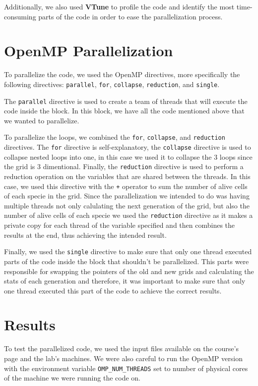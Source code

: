 \documentclass{article}
\begin{document}
Additionally, we also used \textbf{VTune} to profile the code and 
identify the most time-consuming parts of the code in order to ease 
the parallelization process.

\section{OpenMP Parallelization}
To parallelize the code, we used the OpenMP directives, more specifically  
the following directives: \texttt{parallel}, \texttt{for}, \texttt{collapse}, 
\texttt{reduction}, and \texttt{single}.

The \texttt{parallel} directive is used to create a team of threads 
that will execute the code inside the block. In this block, we have 
all the code mentioned above that we wanted to parallelize. 

To parallelize the loops, we combined the \texttt{for}, \texttt{collapse}, 
and \texttt{reduction} directives. The \texttt{for} directive is self-explanatory, 
the \texttt{collapse} directive is used to collapse nested loops into one, in 
this case we used it to collapse the 3 loops since the grid is 3 dimentional.
Finally, the \texttt{reduction} directive is used to perform a reduction 
operation on the variables that are shared between the threads. In this case, we 
used this directive with the \texttt{+} operator to sum the number of alive cells 
of each specie in the grid. Since the parallelization we intended to do was having 
multiple threads not only calulating the next generation of the grid, but also the 
number of alive cells of each specie we used the \texttt{reduction} directive as it 
makes a private copy for each thread of the variable specified and then combines 
the results at the end, thus achieving the intended result. 

Finally, we used the \texttt{single} directive to make sure that only one thread 
executed parts of the code inside the block that shouldn't be parallelized. This 
parts were responsible for swapping the pointers of the old and new grids and calculating the 
stats of each generation and therefore, it was important to make sure that only 
one thread executed this part of the code to achieve the correct results.

\section{Results}

To test the parallelized code, we used the input files available on the course's page 
and the lab's machines. We were also careful to run the OpenMP version with the 
environment variable \texttt{OMP\_NUM\_THREADS} set to number of physical cores 
of the machine we were running the code on. 
\end{document}
